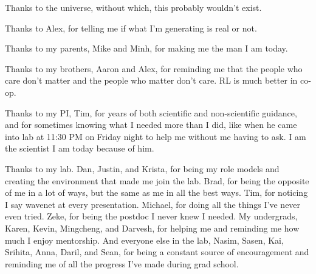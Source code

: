 \begin{frontmatter}
%


%
\tableofcontents
\listoffigures  %



%
%
\begin{acknowledgements}
\setlength{\parindent}{0cm}
 Thanks to the universe, without which, this probably wouldn't exist.
 
 Thanks to Alex, for telling me if what I'm generating is real or not.
 
 Thanks to my parents, Mike and Minh, for making me the man I am today.
 
 Thanks to my brothers, Aaron and Alex, for reminding me that the people who care don't matter and the people who matter don't care. RL is much better in co-op.
 
 Thanks to my PI, Tim, for years of both scientific and non-scientific guidance, and for sometimes knowing what I needed more than I did, like when he came into lab at 11:30 PM on Friday night to help me without me having to ask. I am the scientist I am today because of him.
 
 Thanks to my lab. Dan, Justin, and Krista, for being my role models and creating the environment that made me join the lab. Brad, for being the opposite of me in a lot of ways, but the same as me in all the best ways. Tim, for noticing I say wavenet at every presentation. Michael, for doing all the things I've never even tried. Zeke, for being the postdoc I never knew I needed. My undergrads, Karen, Kevin, Mingcheng, and Darvesh, for helping me and reminding me how much I enjoy mentorship. And everyone else in the lab, Nasim, Sasen, Kai, Srihita, Anna, Daril, and Sean, for being a constant source of encouragement and reminding me of all the progress I've made during grad school.
 

\end{acknowledgements}
\end{frontmatter}
